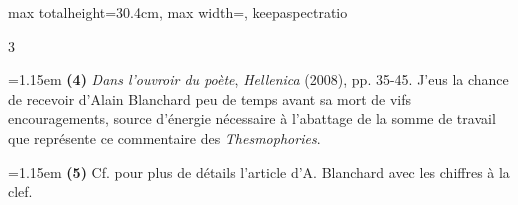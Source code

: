 \documentclass[11pt,twoside]{book}
\newcommand{\currHeadLE}{}
\newcommand{\currHeadRE}{}
\newcommand{\currHeadLO}{}
\newcommand{\currHeadRO}{}
\newcommand{\italique}[1]{\textit{#1}}
\newcommand{\R}{\textbf{R}}
\begin{document}
\begin{adjustbox}{max totalheight=30.4cm, max width=\textwidth, keepaspectratio}
\begin{minipage}{\textwidth}
{\begin{multicols}{3}
\par\vspace{1.5pt}
\noindent\hangindent=1.15em {\color{sepiaNote}\textbf{(4)}} \italique{Dans l'ouvroir du poète}, \italique{Hellenica} (2008), pp. 35-45. J'eus la chance de recevoir d'Alain Blanchard peu de temps avant sa mort de vifs encouragements, source d'énergie nécessaire à l'abattage de la somme de travail que représente ce commentaire des \italique{Thesmophories}.
\par\vspace{1.5pt}
\noindent\hangindent=1.15em {\color{sepiaNote}\textbf{(5)}} Cf. pour plus de détails l'article d'A. Blanchard avec les chiffres à la clef.
\par\end{multicols}}
\end{minipage}\end{adjustbox}
\clearpage\ifodd\value{page}\hbox{}\newpage\fi
\renewcommand{\currHeadLE}{ΑΡΙΣΤΟΦΑΝΟΥΣ ΘΕΣΜΟΦΟΡΙΑΖΟΥΣΑΙ · CODEX RAVENNAS 429 (\R)}
\renewcommand{\currHeadRE}{Folio f. 164r (Classense 166r) · vv. 123–164}
\renewcommand{\currHeadLO}{FAC-SIMILÉ DU CODEX RAVENNAS 429 (\R) · f. 164r (Classense 166r)}
\renewcommand{\currHeadRO}{vv. 123–164 · Planche recadrée sur la zone écrite et harmonisée}
\end{document}
